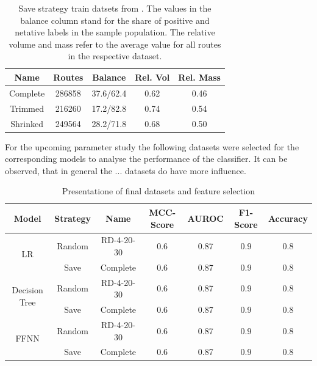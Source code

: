 \begin{table}[ht]
  \centering
  \begin{tabular}{c c c c c}
    \toprule
    Name     & Routes & Balance   & Rel. Vol & Rel. Mass \\
    \midrule
    Complete & 286858 & 37.6/62.4 & 0.62     & 0.46      \\
    Trimmed  & 216260 & 17.2/82.8 & 0.74     & 0.54      \\
    Shrinked & 249564 & 28.2/71.8 & 0.68     & 0.50      \\
    \bottomrule
  \end{tabular}
  \caption[Save strategy train datsets from \gendreauDataSetText.]{Save strategy train datsets from \gendreauDataSetText.
    The values in the balance column stand for the share of positive and netative labels in the sample population. The relative volume
    and mass refer to the average value for all routes in the respective dataset.}
  \label{tab:saved_instances_gendreau}
\end{table}

For the upcoming parameter study the following datasets were selected for the corresponding models
to analyse the performance of the classifier. It can be observed, that in general the ... datasets
do have more influence.

\begin{table}[ht]
  \centering
  \begin{tabular}{c c c c c c c}
    \toprule
    Model                          & Strategy & Name       & \gls{MCC}-Score & \gls{AUROC} & F1-Score & Accuracy \\
    \midrule
    \multirow{2}{*}{\gls{LR}}      & Random   & RD-4-20-30 & 0.6             & 0.87        & 0.9      & 0.8      \\
                                   & Save     & Complete   & 0.6             & 0.87        & 0.9      & 0.8      \\
    \midrule
    \multirow{2}{*}{Decision Tree} & Random   & RD-4-20-30 & 0.6             & 0.87        & 0.9      & 0.8      \\
                                   & Save     & Complete   & 0.6             & 0.87        & 0.9      & 0.8      \\
    \midrule
    \multirow{2}{*}{\gls{FFNN}}    & Random   & RD-4-20-30 & 0.6             & 0.87        & 0.9      & 0.8      \\
                                   & Save     & Complete   & 0.6             & 0.87        & 0.9      & 0.8      \\

    \bottomrule
  \end{tabular}
  \caption{Presentatione of final datasets and feature selection}
  \label{tab:final_dataset_features}
\end{table}

